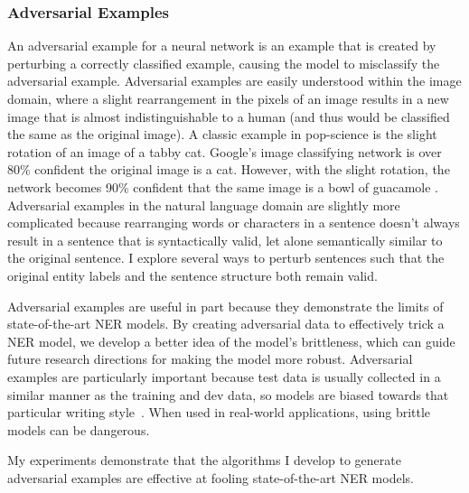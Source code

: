 \subsubsection{Adversarial Examples}
An adversarial example for a neural network is an example that is created by perturbing a correctly classified example, causing the model to misclassify the  adversarial example. Adversarial examples are easily understood within the image domain, where a slight rearrangement in the pixels of an image results in a new image that is almost indistinguishable to a human (and thus would be classified the same as the original image). A classic example in pop-science is the slight rotation of an image of a tabby cat. Google's image classifying network is over 80\% confident the original image is a cat. However, with the slight rotation, the network becomes 90\% confident that the same image is a bowl of guacamole \citep{guacamole}. Adversarial examples in the natural language domain are slightly more complicated because rearranging words or characters in a sentence doesn't always result in a sentence that is syntactically valid, let alone semantically similar to the original sentence. I explore several ways to perturb sentences such that the original entity labels and the sentence structure both remain valid.

Adversarial examples are useful in part because they demonstrate the limits of state-of-the-art NER models. By creating adversarial data to effectively trick a NER model, we develop a better idea of the model's brittleness, which can guide future research directions for making the model more robust. Adversarial examples are particularly important because test data is usually collected in a similar manner as the training and dev data, so models are biased towards that particular writing style~\citep{SEARs}. When used in real-world applications, using brittle models can be dangerous.

My experiments demonstrate that the algorithms I develop to generate adversarial examples are effective at fooling state-of-the-art NER models.

